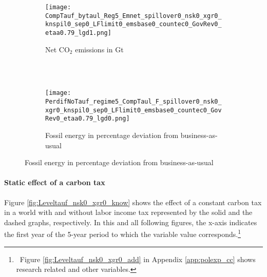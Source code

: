 \begin{figure}[h!!]
	\centering
	\caption{A constant carbon tax equal to US\$185 (2020 prices) per ton of carbon  }\label{fig:Leveltauf_nsk0_xgr0_know}		
	\begin{subfigure}[]{0.4\textwidth}
		\caption{Net CO$_2$ emissions in Gt \\ \ }
		\texttt{[image: CompTauf\_bytaul\_Reg5\_Emnet\_spillover0\_nsk0\_xgr0\_knspil0\_sep0\_LFlimit0\_emsbase0\_countec0\_GovRev0\_etaa0.79\_lgd1.png]}
	\end{subfigure}	
	\begin{minipage}[]{0.1\textwidth}
		\
	\end{minipage}
	\begin{subfigure}[]{0.4\textwidth}
		\caption{Fossil energy in percentage deviation from business-as-usual}
		\texttt{[image: PerdifNoTauf\_regime5\_CompTaul\_F\_spillover0\_nsk0\_xgr0\_knspil0\_sep0\_LFlimit0\_emsbase0\_countec0\_GovRev0\_etaa0.79\_lgd0.png]}
	\end{subfigure}
\end{figure} 

\paragraph{Static effect of a carbon tax}
Figure \ref{fig:Leveltauf_nsk0_xgr0_know} shows the effect of a constant carbon tax in a world with and without labor income tax represented by the solid and the dashed graphs, respectively. In this and all following figures, the x-axis indicates the first year of the 5-year period to which the variable value corresponds.\footnote{\ Figure \ref{fig:Leveltauf_nsk0_xgr0_add} in Appendix \ref{app:polexp_cc} shows research related and other variables.}  


